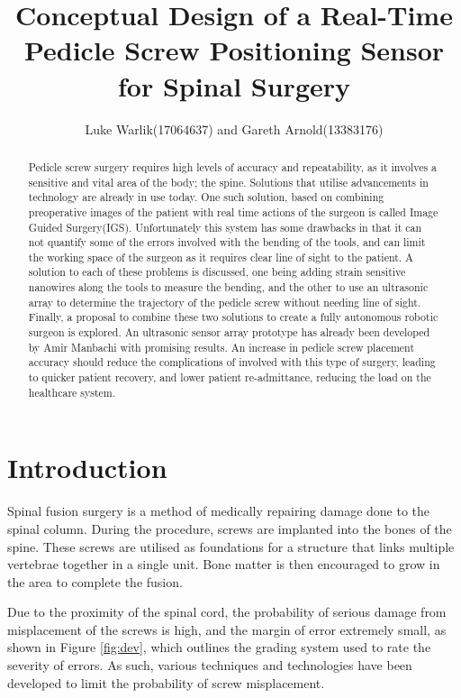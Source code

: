 \documentclass[conference, a4paper]{IEEEtran}
\begin{document}
%
\title{Conceptual Design of a Real-Time Pedicle Screw Positioning Sensor for
Spinal Surgery}
\author{Luke Warlik(17064637) and Gareth Arnold(13383176)}


\maketitle


\begin{abstract}
	Pedicle screw surgery requires high levels of accuracy and repeatability, 
	as it involves a sensitive and vital area of the body; the spine. Solutions
	that utilise advancements in technology are already in use today. One such
	solution, based on combining preoperative images of the patient with 
	real time actions of the surgeon is called Image Guided Surgery(IGS). Unfortunately
	this system has some drawbacks in that it can not quantify some of the errors involved
	with the bending of the tools, and can limit the working space of the surgeon as it
	requires clear line of sight to the patient. A solution to each of these problems 
	is discussed, one being adding strain sensitive nanowires along the tools to measure
	the bending, and the other to use an ultrasonic array to determine the trajectory 
	of the pedicle screw without needing line of sight. Finally, a proposal to combine
	these two solutions to create a fully autonomous robotic surgeon is explored.
	An ultrasonic sensor array prototype has already been developed by Amir Manbachi with 
	promising results. An increase in pedicle screw placement accuracy should reduce
	the complications of involved with this type of surgery, leading to quicker 
	patient recovery, and lower patient re-admittance, reducing the load on the 
	healthcare system.
\end{abstract}


\section{Introduction}

Spinal fusion surgery is a method of medically repairing damage done to the spinal column. During the
procedure, screws are implanted into the bones of the spine. These screws are utilised as foundations for a
structure that links multiple vertebrae together in a single unit. Bone matter is then encouraged to grow in the
area to complete the fusion\cite{Manbachi2014}.

Due to the proximity of the spinal cord, the probability of serious damage from
misplacement of the screws is high, and the margin of error extremely small, as shown in Figure \ref{fig:dev}, 
which outlines the grading system used to rate the severity of errors.
As such, various techniques and technologies have been developed to limit the probability of screw misplacement\cite{neuro}.
\end{document}
